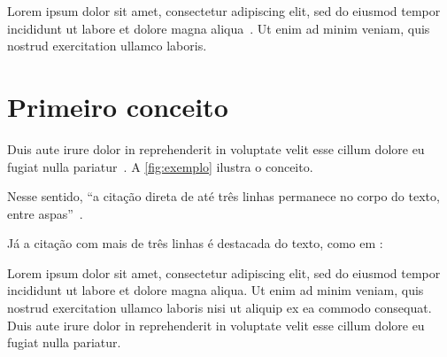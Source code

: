 
Lorem ipsum dolor sit amet, consectetur adipiscing elit, sed do eiusmod tempor
incididunt ut labore et dolore magna aliqua~\parencite{exemplo-livro}. Ut enim ad
minim veniam, quis nostrud exercitation ullamco laboris.

\section{Primeiro conceito}
\label{sec:conceito-um}

Duis aute irure dolor in reprehenderit in voluptate velit esse cillum dolore eu
fugiat nulla pariatur~\parencite{exemplo-artigo}. A \autoref{fig:exemplo} ilustra
o conceito.

Nesse sentido, \enquote{a citação direta de até três linhas permanece no corpo do
texto, entre aspas}~\parencite[p. 15]{exemplo-livro}.

Já a citação com mais de três linhas é destacada do texto, como em
\textcite[p. 86]{exemplo-livro}:

\begin{citacao}
  Lorem ipsum dolor sit amet, consectetur adipiscing elit, sed do eiusmod tempor
  incididunt ut labore et dolore magna aliqua. Ut enim ad minim veniam, quis
  nostrud exercitation ullamco laboris nisi ut aliquip ex ea commodo consequat.
  Duis aute irure dolor in reprehenderit in voluptate velit esse cillum dolore eu
  fugiat nulla pariatur.
\end{citacao}

